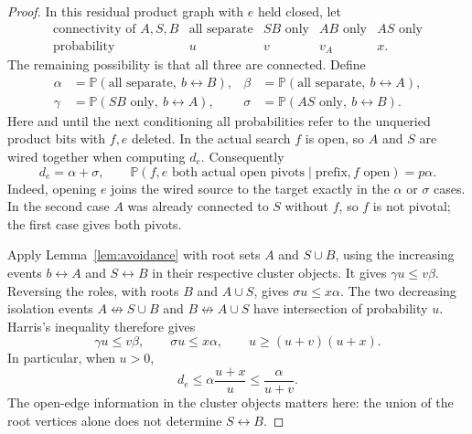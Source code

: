 \documentclass[11pt]{article}
\theoremstyle{definition}
\begin{document}
\begin{proof}
In this residual product graph with $e$ held closed, let
\[
 \begin{array}{c|cccc}
 \text{connectivity of }A,S,B
 &\text{all separate}&SB\text{ only}&AB\text{ only}&AS\text{ only}\\ \hline
 \text{probability}&u&v&v_A&x.
 \end{array}
\]
The remaining possibility is that all three are connected. Define
\[
 \begin{aligned}
 \alpha&=\mathbb P(\text{all separate},\ b\leftrightarrow B),&
 \beta&=\mathbb P(\text{all separate},\ b\leftrightarrow A),\\
 \gamma&=\mathbb P(SB\text{ only},\ b\leftrightarrow A),&
 \sigma&=\mathbb P(AS\text{ only},\ b\leftrightarrow B).
 \end{aligned}
\]
Here and until the next conditioning all probabilities refer to the
unqueried product bits with $f,e$ deleted. In the actual search $f$
is open, so $A$ and $S$ are wired together when computing $d_e$.
Consequently
\begin{equation}\label{eq:dfs-partition-pivots}
 d_e=\alpha+\sigma,
 \qquad
 \mathbb P(f,e\text{ both actual open pivots}\mid\text{prefix},f\text{ open})
 =p\alpha.
\end{equation}
Indeed, opening $e$ joins the wired source to the target exactly in
the $\alpha$ or $\sigma$ cases. In the second case $A$ was already
connected to $S$ without $f$, so $f$ is not pivotal; the first case
gives both pivots.

Apply Lemma~\ref{lem:avoidance} with root sets $A$ and $S\cup B$,
using the increasing events $b\leftrightarrow A$ and
$S\leftrightarrow B$ in their respective cluster objects. It gives
$\gamma u\le v\beta$. Reversing the roles, with roots $B$ and
$A\cup S$, gives $\sigma u\le x\alpha$. The two decreasing isolation
events $A\not\leftrightarrow S\cup B$ and
$B\not\leftrightarrow A\cup S$ have intersection of probability $u$.
Harris's inequality therefore gives
\begin{equation}\label{eq:dfs-isolation-inequalities}
 \gamma u\le v\beta,
 \qquad \sigma u\le x\alpha,
 \qquad u\ge(u+v)(u+x).
\end{equation}
In particular, when $u>0$,
\begin{equation}\label{eq:dfs-pivotal-comparison}
 d_e\le\alpha\frac{u+x}{u}\le\frac\alpha{u+v}.
\end{equation}
The open-edge information in the cluster objects matters here:
the union of the root vertices alone does not determine
$S\leftrightarrow B$.


\end{proof}
\end{document}
